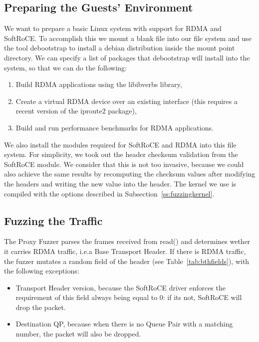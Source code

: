 \subsection{Preparing the Guests' Environment}

We want to prepare a basic Linux system with support for RDMA and SoftRoCE.\@
To accomplish this we mount a blank file into our file system and use the tool
debootstrap to install a debian distribution inside the mount point directory.
We can specify a list of packages that debootstrap will install into the system,
so that we can do the following:

\begin{enumerate}
  \item Build RDMA applications using the libibverbs library,
  \item Create a virtual RDMA device over an existing interface (this requires a recent version of the iproute2 package),
  \item Build and run performance benchmarks for RDMA applications.
\end{enumerate}

We also install the modules required for SoftRoCE and RDMA into this file system.
For simplicity, we took out the header checksum validation from the SoftRoCE module. We consider
that this is not too invasive, because we could also achieve the same results by recomputing the checksum values after modifying
the headers and writing the new value into the header.
The kernel we use is compiled with the options described in Subsection~\ref{ss:fuzzingkernel}.

\subsection{Fuzzing the Traffic}

The Proxy Fuzzer parses the frames received from read() and determines wether it carries RDMA traffic, i.e.\@ a Base Transport Header.
If there is RDMA traffic, the fuzzer mutates a random field of the header (see Table~\ref{tab:bthfields}), with the following exceptions:

\begin{itemize}
  \item Transport Header version, because the SoftRoCE driver enforces the requirement of this field always being equal to 0: if its not, SoftRoCE will drop the packet.
  \item Destination QP, because when there is no Queue Pair with a matching number, the packet will also be dropped.
\end{itemize}

